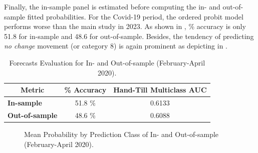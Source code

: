 Finally, the in-sample panel is estimated before computing the in- and out-of-sample fitted probabilities. For the Covid-19 period, the ordered probit model performs worse than the main study in 2023. As shown in , \% accuracy is only 51.8 for in-sample and 48.6 for out-of-sample. Besides, the tendency of predicting \textit{no change} movement (or category 8) is again prominent as depicting in .


\begin{table}[H]
\centering
\begin{tabular}{@{}lcc@{}}
\toprule
\multicolumn{1}{c}{Metric} & \multicolumn{1}{l}{\textbf{\% Accuracy}} & \multicolumn{1}{l}{\textbf{Hand-Till Multiclass AUC}} \\ \midrule
\textbf{In-sample}         & 51.8 \%                                 & 0.6133                                                \\
\textbf{Out-of-sample}     & 48.6 \%                                 & 0.6088                                                \\ \bottomrule
\end{tabular}
\caption{Forecasts Evaluation for In- and Out-of-sample (February-April 2020).}
\label{tab:table-20}
\end{table}



\begin{figure}[H]
    \centering
    \caption{Mean Probability by Prediction Class of In- and Out-of-sample (February-April 2020).}
    \label{fig:figure-6}
\end{figure}








